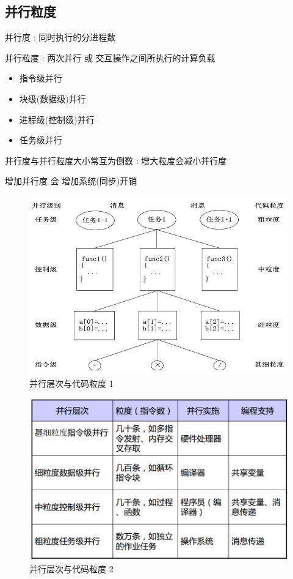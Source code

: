 \documentclass[UTF8,a4paper]{ctexart}
\begin{document}
\subsection{并行粒度}
并行度 : 同时执行的分进程数

并行粒度 : 两次并行 或 交互操作之间所执行的计算负载
\begin{itemize}
  \item 指令级并行
  \item 块级(数据级)并行
  \item 进程级(控制级)并行
  \item 任务级并行
\end{itemize}

并行度与并行粒度大小常互为倒数 : 增大粒度会减小并行度

增加并行度 会 增加系统(同步)开销

\begin{figure}[H]
  \centering
  \includegraphics[scale = 0.3]{assets/ParallelComputing_4ae37.png}
  \caption{并行层次与代码粒度 1}
\end{figure}

\begin{figure}[H]
  \centering
  \includegraphics[scale = 0.3]{assets/ParallelComputing_01fb4.png}
  \caption{并行层次与代码粒度 2}
\end{figure}
\end{document}
